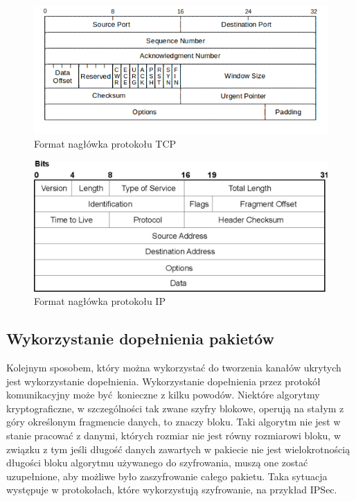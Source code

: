 \documentclass[a4paper, twoside, 12pt]{report}
\begin{document}
        \begin{figure}[h]
                \centering
                \includegraphics{tcp_header}
                \caption{Format nagłówka protokołu TCP}
                \label{TCPHEADER}
        \end{figure}
        \begin{figure}[h]
                \centering
                \includegraphics{ip_header}
                \caption{Format nagłówka protokołu IP}
                \label{IPHEADER}
        \end{figure}
        \subsection{Wykorzystanie dopełnienia pakietów}
        Kolejnym sposobem, który można wykorzystać do tworzenia kanałów ukrytych
        jest wykorzystanie dopełnienia. Wykorzystanie dopełnienia przez protokół komunikacyjny
        może być konieczne z kilku powodów. Niektóre algorytmy kryptograficzne, w szczególności
        tak zwane szyfry blokowe, operują na stałym z góry określonym fragmencie danych,
        to znaczy bloku. Taki algorytm nie jest w stanie pracować z danymi, których
        rozmiar nie jest równy rozmiarowi bloku, w związku z tym jeśli długość
        danych zawartych w pakiecie nie jest wielokrotnością długości bloku
        algorytmu używanego do szyfrowania, muszą one zostać uzupełnione, aby możliwe
        było zaszyfrowanie całego pakietu. Taka sytuacja występuje w protokołach,
        które wykorzystują szyfrowanie, na przykład IPSec\cite{IPSECPADDING}.
\end{document}
